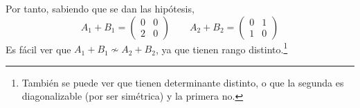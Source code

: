 \begin{ejercicio}
    Por tanto, sabiendo que se dan las hipótesis,
    \begin{equation*}
        A_1 + B_1 = \left( \begin{array}{cc}
            0 & 0 \\
            2 & 0
        \end{array} \right) \qquad
        A_2+B_2 = \left( \begin{array}{cc}
            0 & 1 \\
            1 & 0
        \end{array} \right)
    \end{equation*}
    Es fácil ver que $A_1+B_1 \nsim A_2 + B_2$, ya que tienen rango distinto.\footnote{También se puede ver que tienen determinante distinto, o que la segunda es diagonalizable (por ser simétrica) y la primera no.}
\end{ejercicio}

